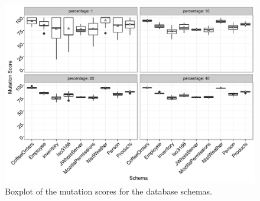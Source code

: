 \begin{figure}[t]
  \includegraphics[scale = 0.5]{graphs/schema_vs_ms.pdf}
  \caption{\label{fig:graph}Boxplot of the mutation scores for the database schemas.}
  \vspace{-.5em}
\end{figure}
